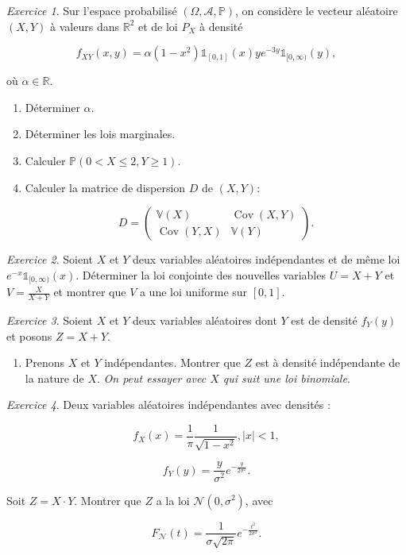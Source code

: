 \documentclass[french]{book}
\theoremstyle{definition}
\theoremstyle{remark}
\newtheorem{exo}{Exercice}
\newcommand{\lesss}{<}
\newcommand{\less}{\lesss}
\begin{document}
\begin{exo}
  Sur l'espace probabilisé \((\Omega, \mathscr{A}, \mathbb{P})\), on considère le vecteur aléatoire \((X, Y)\) à valeurs dans \(\mathbb{R}^2\) et de loi \(P_X\) à densité

  \[f _{XY}(x,y) = \alpha(1-x ^2) \mathds{1}_{[0, 1]}(x)y e^{-3y} \mathds{1}_{[0, \infty)}(y), \]

  où \(\alpha \in \mathbb{R}\).

  \begin{enumerate}
    \item Déterminer \(\alpha\).
    \item Déterminer les lois marginales.
    \item Calculer \(\mathbb{P}(0 \less X \leq 2, Y \geq 1)\).
    \item Calculer la matrice de dispersion \(D\) de \((X,Y)\):

    \[D= \left(\begin{matrix}
      \mathbb{V}(X) & \operatorname{Cov}(X,Y) \\
      \operatorname{Cov}(Y,X) & \mathbb{V}(Y)
    \end{matrix}\right).\]
  \end{enumerate}


\end{exo}

\begin{exo}
  Soient \(X\) et \(Y\) deux variables aléatoires indépendantes et de même loi \(e^{-x}\mathds{1}_{[0, \infty)}(x)\). Déterminer la loi conjointe des nouvelles variables \(U = X+Y\) et \(V = \displaystyle\frac{X}{X+Y}\) et montrer que \(V\) a une loi uniforme sur \([0,1]\).
\end{exo}

\begin{exo}
  Soient \(X\) et \(Y\) deux variables aléatoires dont \(Y\) est de densité \(f _{Y}(y)\) et posons \(Z = X+Y\).

  \begin{enumerate}
    \item Prenons \(X\) et \(Y\) indépendantes. Montrer que \(Z\) est à densité indépendante de la nature de \(X\). \emph{On peut essayer avec \(X\) qui suit une loi binomiale}.
  \end{enumerate}
\end{exo}

\begin{exo}
  Deux variables aléatoires indépendantes avec densités :

  \[f_X(x) = \frac{1}{\pi} \frac{1}{\sqrt{ 1- x ^2 }}, \left\lvert x \right\rvert \less 1,\]

  \[f_Y(y) = \frac{y}{\sigma ^2}e^{- \frac{y}{2 \sigma ^2}}.\]


  Soit \(Z = X \cdot Y\). Montrer que \(Z\) a la loi \(\mathscr{N}(0, \sigma^2)\), avec

  \[F _{\mathscr{N}}(t) = \frac{1}{\sigma \sqrt{ 2 \pi } } e^{-\frac{t ^2}{2 \sigma ^2}}.\]
\end{exo}
\end{document}
